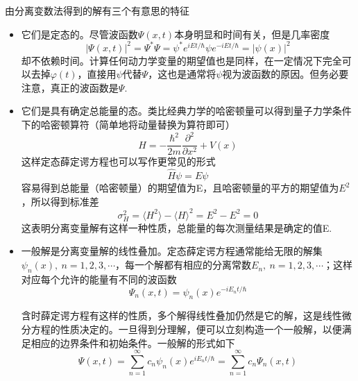 \documentclass[UTF8]{ctexart}
\begin{document}
    由分离变数法得到的解有三个有意思的特征
    \begin{itemize}
        \item \qquad 它们是定态的。尽管波函数$\Psi(x,t)$本身明显和时间有关，但是几率密度
        \begin{equation}
            |\Psi(x,t)|^2 = \Psi^* \Psi = \psi^* e^{iEt/\hbar} \psi e^{-iEt/\hbar} = |\psi(x)|^2
        \end{equation}
    \noindent 却不依赖时间。计算任何动力学变量的期望值也是同样，在一定情况下完全可以去掉$\varphi(t)$，直接用$\psi$代替$\Psi$，这也是通常将$\psi$视为波函数的原因。但务必要注意，真正的波函数是$\Psi$.

        \item \qquad 它们是具有确定总能量的态。类比经典力学的哈密顿量可以得到量子力学条件下的哈密顿算符（简单地将动量替换为算符即可）
        \begin{equation}
            \hat{H} = -\frac{\hbar^2}{2m} \frac{\partial^2}{\partial x^2} + V(x)
        \end{equation}
    \noindent 这样定态薛定谔方程也可以写作更常见的形式
    \begin{equation}
        \hat{H} \psi= E \psi 
    \end{equation}
    \noindent 容易得到总能量（哈密顿量）的期望值为E，且哈密顿量的平方的期望值为$E^2$，所以得到标准差
    \begin{equation}
        \sigma_H^2 = \langle H^2 \rangle - \langle H \rangle^2 = E^2-E^2 = 0
    \end{equation}
    \noindent 这表明分离变量解有这样一种性质，总能量的每次测量结果是确定的值E.

        \item \qquad 一般解是分离变量解的线性叠加。定态薛定谔方程通常能给无限的解集$\psi_n(x),\ n=1,2,3,\cdots$，每一个解都有相应的分离常数$E_n,\ n=1,2,3,\cdots$；这样对应每个允许的能量有不同的波函数
        \begin{equation}
            \Psi_n(x,t) = \psi_n(x) e^{-iE_n t/\hbar}
        \end{equation}

        \noindent 含时薛定谔方程有这样的性质，多个解得线性叠加仍然是它的解，这是线性微分方程的性质决定的。一旦得到分理解，便可以立刻构造一个一般解，以便满足相应的边界条件和初始条件。一般解的形式如下
        \begin{equation}
            \Psi(x,t) = \sum_{n=1}^{\infty} c_n \psi_n(x) e^{iE_n t/\hbar} = \sum_{n=1}^{\infty} c_n \Psi_n(x,t)\label{equ2.2}
        \end{equation}
    \end{itemize}
\end{document}
